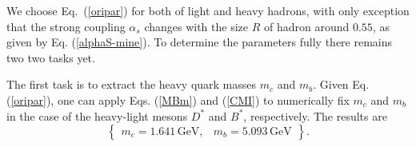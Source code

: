 \documentclass[12pt,onecolumn,floatfix,nofootinbib]{revtex4}
\begin{document}
We choose Eq.~(\ref{oripar}) for both of light and heavy hadrons, with only
exception that the strong coupling $\alpha _{s}$ changes with the size $R$
of hadron around $0.55$, as given by Eq. (\ref{alphaS-mine}). To determine
the parameters fully there remains two two tasks yet.

The first task is to extract the heavy quark masses $m_{c}$ and $m_{b}$.
Given Eq. (\ref{oripar}), one can apply Eqs. (\ref{MBm}) and (\ref{CMI}) to
numerically fix $m_{c}$ and $m_{b}$ in the case of the heavy-light mesons $%
D^{\ast }$ and $B^{\ast }$, respectively. The results are
\begin{equation}
\begin{Bmatrix}
m_{c}=1.641\,\text{GeV}, & m_{b}=5.093\,\text{GeV}%
\end{Bmatrix}.
\label{mcmb}
\end{equation}
\end{document}
